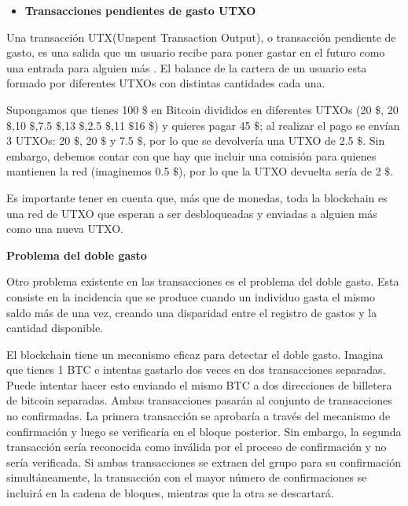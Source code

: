 \documentclass[11pt]{article} %
\begin{document}
\vspace{3ex}

\begin{itemize}
	\item \textbf{Transacciones pendientes de gasto UTXO}
\end{itemize}

Una transacción UTX(Unspent Transaction Output), o transacción pendiente de gasto, es una salida que un usuario recibe para poner gastar en el futuro como una entrada para alguien más \cite{UTXO}. El balance de la cartera de un usuario esta formado por diferentes UTXOs con distintas cantidades cada una.

Supongamos que tienes 100 $\$$ en Bitcoin divididos en diferentes UTXOs (20 $\$$, 20 $\$$,10 $\$$,7.5 $\$$,13 $\$$,2.5 $\$$,11 $\$$16 $\$$) y quieres pagar 45 $\$$; al realizar el pago se envían 3 UTXOs: 20  $\$$, 20  $\$$ y 7.5 $\$$, por lo que se devolvería una UTXO de 2.5  $\$$. Sin embargo, debemos contar con que hay que incluir una comisión para quienes mantienen la red (imaginemos 0.5 $\$$), por lo que la UTXO devuelta sería de 2 $\$$.


Es importante tener en cuenta que, más que de monedas, toda la blockchain es una red de UTXO que esperan a ser desbloqueadas y enviadas a alguien más como una nueva UTXO.

\item \textbf{Problema del doble gasto}

Otro problema existente en las transacciones es el problema del doble gasto. Esta consiste en la incidencia que se produce cuando un individuo gasta el mismo saldo más de una vez, creando una disparidad entre el registro de gastos y la cantidad disponible.

El blockchain tiene un mecanismo eficaz para detectar el doble gasto. Imagina que tienes 1 BTC e intentas gastarlo dos veces en dos transacciones separadas. Puede intentar hacer esto enviando el mismo BTC a dos direcciones de billetera de bitcoin separadas. Ambas transacciones pasarán al conjunto de transacciones no confirmadas. La primera transacción se aprobaría a través del mecanismo de confirmación y luego se verificaría en el bloque posterior. Sin embargo, la segunda transacción sería reconocida como inválida por el proceso de confirmación y no sería verificada. Si ambas transacciones se extraen del grupo para su confirmación simultáneamente, la transacción con el mayor número de confirmaciones se incluirá en la cadena de bloques, mientras que la otra se descartará.
\end{document}

